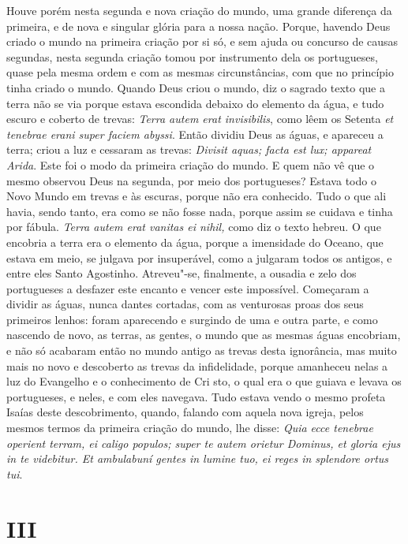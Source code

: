 Houve porém nesta segunda e nova criação do mundo, uma grande diferença
da primeira, e de nova e singular glória para a nossa nação. Porque,
havendo Deus criado o mundo na primeira criação por si só, e sem ajuda
ou concurso de causas segundas, nesta segunda criação tomou por
instrumento dela os portugueses, quase pela mesma ordem e com as mesmas
circunstâncias, com que no princípio tinha criado o mundo.
Quando Deus criou o mundo, diz o sagrado texto que a terra não se via
porque estava escondida debaixo do elemento da água, e tudo escuro e
coberto de trevas: \emph{Terra autem erat invisibilis}, como lêem os
Setenta \emph{et tenebrae erani super faciem abyssi}. Então dividiu Deus as águas, e apareceu a terra; criou a luz e cessaram as trevas: \emph{Divisit aquas;
facta est lux; appareat Arida}. Este foi o modo da
primeira criação do mundo. E quem não vê que o mesmo observou Deus na
segunda, por meio
dos portugueses? Estava todo o Novo Mundo em trevas e às escuras, porque
não era conhecido. Tudo o que ali havia, sendo tanto, era como se não
fosse nada, porque assim se cuidava e tinha por fábula. \emph{Terra
autem erat vanitas ei nihil,} como diz o texto hebreu.
O que encobria a terra era o elemento da água, porque a
imensidade do Oceano, que estava em meio, se julgava por insuperável,
como a julgaram todos os antigos, e entre eles Santo Agostinho.
Atreveu"-se, finalmente, a ousadia e zelo dos portugueses a desfazer este
encanto e vencer este impossível. Começaram a dividir as águas, nunca
dantes cortadas, com as venturosas proas dos seus primeiros lenhos:
foram aparecendo e surgindo de uma e outra parte, e como nascendo de
novo, as terras, as gentes, o mundo que as mesmas águas encobriam, e não
só acabaram então no mundo antigo as trevas desta ignorância, mas muito
mais no novo e descoberto as trevas da infidelidade, porque amanheceu
nelas a luz do Evangelho e o conhecimento de Cri sto, o qual era o que
guiava e levava os portugueses, e neles, e com eles navegava. Tudo
estava vendo o mesmo profeta Isaías deste descobrimento, quando, falando
com aquela nova igreja, pelos mesmos termos da primeira criação do
mundo, lhe disse: \emph{Quia ecce tenebrae operient terram, ei caligo
populos; super te autem orietur Dominus, et gloria ejus in te videbitur.
Et ambulabuní gentes in lumine tuo, ei reges in splendore ortus
tui}.

\section*{III}

